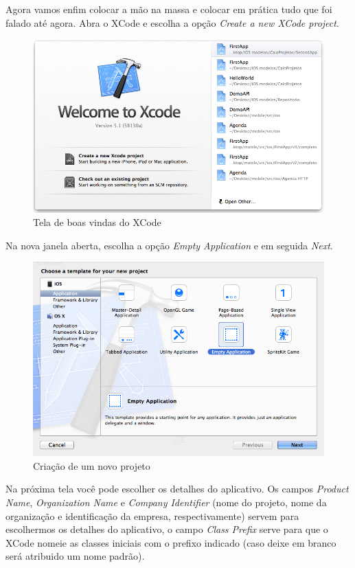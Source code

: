\documentclass[a4paper,12pt,brazil,doubleside]{book}
\begin{document}
\begin{singlespace}
Agora vamos enfim colocar a mão na massa e colocar em prática tudo que foi falado até agora. Abra o XCode e escolha a opção \emph{Create a new XCode project}.

\begin{figure}[H]
  \centering
  \includegraphics[width=.75\textwidth]{figuras/3/tela_boas_vindas_xcode.png}
  \caption{Tela de boas vindas do XCode}
  \label{fig:a}
\end{figure}


Na nova janela aberta, escolha a opção \emph{Empty Application} e em seguida \emph{Next}.

\begin{figure}[H]
  \centering
  \includegraphics[width=.75\textwidth]{figuras/3/tela_novo_projeto_1.png}
  \caption{Criação de um novo projeto}
  \label{fig:a}
\end{figure}


Na próxima tela você pode escolher os detalhes do aplicativo. Os campos \emph{Product Name}, \emph{Organization Name} e \emph{Company Identifier} (nome do projeto, nome da organização e identificação da empresa, respectivamente) servem para escolhermos os detalhes do aplicativo, o campo \emph{Class Prefix} serve para que o XCode nomeie as classes iniciais com o prefixo indicado (caso deixe em branco será atribuido um nome padrão).


\end{singlespace}
\end{document}
